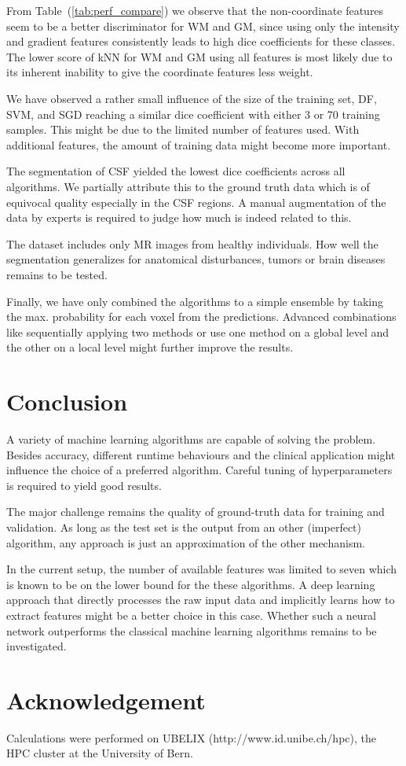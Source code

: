\documentclass[journal]{IEEEtran}
\begin{document}
From Table~(\ref{tab:perf_compare}) we observe that the non-coordinate features seem to be a better discriminator for WM and GM, since using only the intensity and gradient features consistently leads to high dice coefficients for these classes. The lower score of kNN for WM and GM using all features is most likely due to its inherent inability to give the coordinate features less weight.

We have observed a rather small influence of the size of the training set, DF, SVM, and SGD reaching a similar dice coefficient with either 3 or 70 training samples. This might be due to the limited number of features used. With additional features, the amount of training data might become more important.

The segmentation of CSF yielded the lowest dice coefficients across all algorithms. We partially attribute this to the ground truth data which is of equivocal quality especially in the CSF regions. A manual augmentation of the data by experts is required to judge how much is indeed related to this.

The dataset includes only MR images from healthy individuals. How well the segmentation generalizes for anatomical disturbances, tumors or brain diseases remains to be tested.

Finally, we have only combined the algorithms to a simple ensemble by taking the max. probability for each voxel from the predictions. Advanced combinations like sequentially applying two methods or use one method on a global level and the other on a local level might further improve the results.

\section{Conclusion}
A variety of machine learning algorithms are capable of solving the problem. Besides accuracy, different runtime behaviours and the clinical application might influence the choice of a preferred algorithm. Careful tuning of hyperparameters is required to yield good results.

The major challenge remains the quality of ground-truth data for training and validation. As long as the test set is the output from an other (imperfect) algorithm, any approach is just an approximation of the other mechanism.

In the current setup, the number of available features was limited to seven which is known to be on the lower bound for the these algorithms. A deep learning approach that directly processes the raw input data and implicitly learns how to extract features might be a better choice in this case. Whether such a neural network outperforms the classical machine learning algorithms remains to be investigated.

\section*{Acknowledgement}
Calculations were performed on UBELIX (http://www.id.unibe.ch/hpc), the HPC cluster at the University of Bern.



\end{document}
